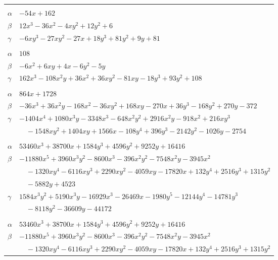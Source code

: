 \documentclass[11pt]{article}
\begin{document}
\begin{longtable}{@{}ll@{}}
\addlinespace[3pt]
\multicolumn{2}{@{}l}{$\{i,j\}=\{18,19\}$, $k_{ij}=2\cdot 3^{5}$}\\
$\alpha$ & $-54x+162$\\
$\beta$ & $12x^{3}-36x^{2}-4xy^{2}+12y^{2}+6$\\
$\gamma$ & $-6xy^{3}-27xy^{2}-27x+18y^{3}+81y^{2}+9y+81$\\
\addlinespace[3pt]
\multicolumn{2}{@{}l}{$\{i,j\}=\{18,37\}$, $k_{ij}=2^{2}\cdot 3^{4}$}\\
$\alpha$ & $108$\\
$\beta$ & $-6x^{2}+6xy+4x-6y^{2}-5y$\\
$\gamma$ & $162x^{3}-108x^{2}y+36x^{2}+36xy^{2}-81xy-18y^{3}+93y^{2}+108$\\
\addlinespace[3pt]
\multicolumn{2}{@{}l}{$\{i,j\}=\{18,46\}$, $k_{ij}=2\cdot 3^{4}\cdot 7^{2}$}\\
$\alpha$ & $864x+1728$\\
$\beta$ & $-36x^{3}+36x^{2}y-168x^{2}-36xy^{2}+168xy-270x+36y^{3}-168y^{2}+270y-372$\\
$\gamma$ & $-1404x^{4}+1080x^{3}y-3348x^{3}-648x^{2}y^{2}+2916x^{2}y-918x^{2}+216xy^{3}$\\
 & $\quad -1548xy^{2}+1404xy+1566x-108y^{4}+396y^{3}-2142y^{2}-1026y-2754$\\
\addlinespace[3pt]
\multicolumn{2}{@{}l}{$\{i,j\}=\{18,50\}$, $k_{ij}=2^{5}\cdot 3^{4}\cdot 19$}\\
$\alpha$ & $53460x^{3}+38700x+1584y^{3}+4596y^{2}+9252y+16416$\\
$\beta$ & $-11880x^{5}+3960x^{3}y^{2}-8600x^{3}-396x^{2}y^{2}-7548x^{2}y-3945x^{2}$\\
 & $\quad -1320xy^{4}-6116xy^{3}+2290xy^{2}-4059xy-17820x+132y^{4}+2516y^{3}+1315y^{2}$\\
 & $\quad -5882y+4523$\\
$\gamma$ & $1584x^{3}y^{2}+5190x^{3}y-16929x^{3}-26469x-1980y^{5}-12144y^{4}-14781y^{3}$\\
 & $\quad -8118y^{2}-36609y-44172$\\
\addlinespace[3pt]
\multicolumn{2}{@{}l}{$\{i,j\}=\{18,67\}$, $k_{ij}=2^{5}\cdot 3^{4}\cdot 19$}\\
$\alpha$ & $53460x^{3}+38700x+1584y^{3}+4596y^{2}+9252y+16416$\\
$\beta$ & $-11880x^{5}+3960x^{3}y^{2}-8600x^{3}-396x^{2}y^{2}-7548x^{2}y-3945x^{2}$\\
 & $\quad -1320xy^{4}-6116xy^{3}+2290xy^{2}-4059xy-17820x+132y^{4}+2516y^{3}+1315y^{2}$\\

\end{longtable}
\end{document}
